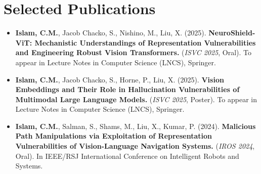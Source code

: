 \documentclass[letterpaper,10.5pt]{article}
\begin{document}
\section{Selected Publications}
\begin{itemize}[label={},leftmargin=*, itemsep=-0.1em,]

\item \textbullet \quad \textbf{Islam, C.M.}, Jacob Chacko, S., Nishino, M., Liu, X. (2025). \textbf{NeuroShield-ViT: Mechanistic Understandings of Representation Vulnerabilities and Engineering Robust Vision Transformers.} (\textit{ISVC 2025}, Oral). To appear in Lecture Notes in Computer Science (LNCS), Springer.


\item \textbullet \quad \textbf{Islam, C.M.}, Jacob Chacko, S., Horne, P., Liu, X. (2025). \textbf{Vision Embeddings and Their Role in Hallucination Vulnerabilities of Multimodal Large Language Models.} (\textit{ISVC 2025}, Poster). To appear in Lecture Notes in Computer Science (LNCS), Springer.

\item \textbullet \quad \textbf{Islam, C.M.}, Salman, S., Shams, M., Liu, X., Kumar, P. (2024). \textbf{Malicious Path Manipulations via Exploitation of Representation Vulnerabilities of Vision-Language Navigation Systems.} (\textit{IROS 2024}, Oral). In IEEE/RSJ International Conference on Intelligent Robots and Systems.



\end{itemize}
\end{document}

